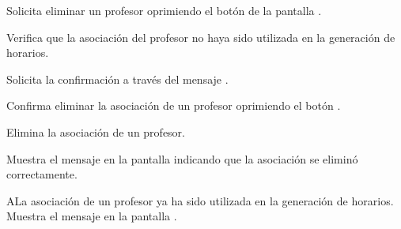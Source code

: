 \begin{UCtrayectoria}
	\UCpaso [\UCactor] Solicita eliminar un profesor oprimiendo el botón  
	de la pantalla .
	
	\UCpaso [\UCsist] Verifica que la asociación del profesor no haya sido utilizada en la generación de horarios. 
	
	\UCpaso [\UCsist] Solicita la confirmación a través del mensaje .
	
	\UCpaso [\UCactor] Confirma eliminar la asociación de un profesor oprimiendo el botón .
	
	\UCpaso [\UCsist] Elimina la asociación de un  profesor.
	
	\UCpaso [\UCsist] Muestra el mensaje  en la pantalla  indicando que la asociación se eliminó correctamente.	
	
\end{UCtrayectoria}

\begin{UCtrayectoriaA}{A}{La asociación de un profesor ya ha sido utilizada en la generación de horarios.}
	\UCpaso [\UCsist] Muestra el mensaje  en la pantalla . 
\end{UCtrayectoriaA}
